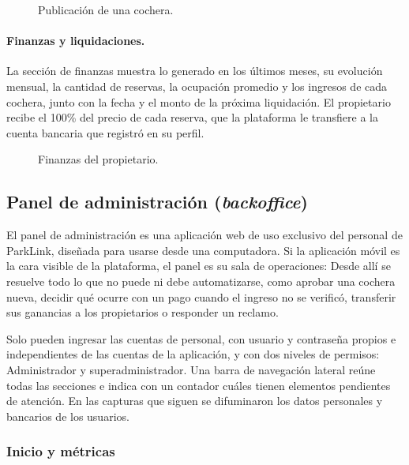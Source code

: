 \begin{figure}[H]
\centering
{}
\caption{Publicación de una cochera.}
\label{fig:app_publicacion}
\end{figure}

\paragraph{Finanzas y liquidaciones.} La sección de finanzas muestra lo generado en los últimos meses, su evolución mensual, la cantidad de reservas, la ocupación promedio y los ingresos de cada cochera, junto con la fecha y el monto de la próxima liquidación. El propietario recibe el 100\% del precio de cada reserva, que la plataforma le transfiere a la cuenta bancaria que registró en su perfil.

\begin{figure}[H]
\centering
{}
\caption{Finanzas del propietario.}
\label{fig:app_finanzas}
\end{figure}

\subsection{Panel de administración (\textit{backoffice})}\label{sec:backoffice}

El panel de administración es una aplicación web de uso exclusivo del personal de ParkLink, diseñada para usarse desde una computadora. Si la aplicación móvil es la cara visible de la plataforma, el panel es su sala de operaciones: Desde allí se resuelve todo lo que no puede ni debe automatizarse, como aprobar una cochera nueva, decidir qué ocurre con un pago cuando el ingreso no se verificó, transferir sus ganancias a los propietarios o responder un reclamo.

Solo pueden ingresar las cuentas de personal, con usuario y contraseña propios e independientes de las cuentas de la aplicación, y con dos niveles de permisos: Administrador y superadministrador. Una barra de navegación lateral reúne todas las secciones e indica con un contador cuáles tienen elementos pendientes de atención. En las capturas que siguen se difuminaron los datos personales y bancarios de los usuarios.

\FloatBarrier
\subsubsection{Inicio y métricas}

